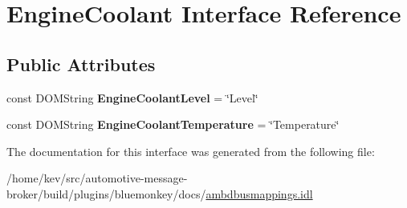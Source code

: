 \hypertarget{interfaceEngineCoolant}{\section{Engine\+Coolant Interface Reference}
\label{interfaceEngineCoolant}
}
\subsection*{Public Attributes}
\begin{DoxyCompactItemize}
\item 
\hypertarget{interfaceEngineCoolant_a7245fb937d72b4799fbe6379252f1fda}{const D\+O\+M\+String {\bfseries Engine\+Coolant\+Level} = \char`\"{}Level\char`\"{}}\label{interfaceEngineCoolant_a7245fb937d72b4799fbe6379252f1fda}

\item 
\hypertarget{interfaceEngineCoolant_a561d51436c678300a5c433ea947d489a}{const D\+O\+M\+String {\bfseries Engine\+Coolant\+Temperature} = \char`\"{}Temperature\char`\"{}}\label{interfaceEngineCoolant_a561d51436c678300a5c433ea947d489a}

\end{DoxyCompactItemize}


The documentation for this interface was generated from the following file\+:\begin{DoxyCompactItemize}
\item 
/home/kev/src/automotive-\/message-\/broker/build/plugins/bluemonkey/docs/\hyperlink{ambdbusmappings_8idl}{ambdbusmappings.\+idl}\end{DoxyCompactItemize}
